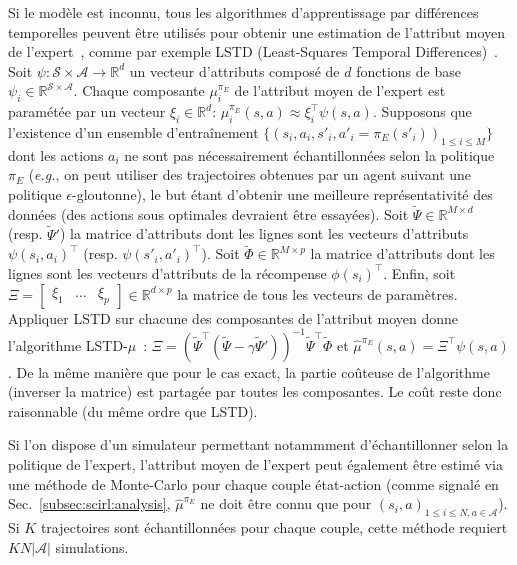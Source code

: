 \documentclass[english,utf8]{./hermes-journal}
\newcommand{\s}{\mathcal{S}}
\newcommand{\A}{\mathcal{A}}
\begin{document}
Si le modèle est inconnu, tous les algorithmes d'apprentissage par différences temporelles peuvent être utilisés pour obtenir une estimation de l'attribut moyen de l'expert~\cite{Klein:2011}, comme par exemple LSTD (Least-Squares Temporal
Differences)~\cite{Bradtke:1996}. Soit $\psi:\s\times \A \rightarrow
\mathbb{R}^d$ un vecteur d'attributs composé de $d$ fonctions de base
$\psi_i \in\mathbb{R}^{\s\times \A}$. Chaque composante $\mu_i^{\pi_E}$
 de l'attribut moyen de l'expert est paramétée par un vecteur
$\xi_i\in\mathbb{R}^d$: $\mu_i^{\pi_E}(s,a)\approx \xi_i^\top
\psi(s,a)$. Supposons que l'existence d'un ensemble d'entraînement
$\{(s_i,a_i,s'_i,a'_i=\pi_E(s'_i))_{1\leq i \leq M}\}$ dont les actions 
$a_i$ ne sont pas nécessairement échantillonnées selon la politique $\pi_E$
(\textit{e.g.}, on peut utiliser des trajectoires obtenues par un agent suivant une politique $\epsilon$-gloutonne), le but étant d'obtenir une meilleure représentativité des données (des actions sous optimales devraient être essayées). Soit $\tilde{\Psi}\in \mathbb{R}^{M\times d}$
(resp. $\tilde{\Psi}'$) la matrice d'attributs dont les lignes sont les vecteurs d'attributs $\psi(s_i,a_i)^\top$ (resp. $\psi(s'_i,a'_i)^\top$).
Soit $\tilde{\Phi}\in \mathbb{R}^{M\times p}$ la matrice d'attributs dont les lignes sont les vecteurs d'attributs de la récompense $\phi(s_i)^\top$.
Enfin, soit $\Xi =
\begin{bmatrix}   \xi_1 & \dots & \xi_p
\end{bmatrix}\in\mathbb{R}^{d\times p}$ la matrice de tous les vecteurs de paramètres. Appliquer LSTD sur chacune des composantes de l'attribut moyen donne l'algorithme LSTD-$\mu$~\cite{Klein:2011}: $\Xi =
(\tilde{\Psi}^\top(\tilde{\Psi} - \gamma
\tilde{\Psi}'))^{-1}\tilde{\Psi}^\top \tilde{\Phi}$ et
$\hat{\mu}^{\pi_E}(s,a) = \Xi^\top \psi(s,a)$.
De la même manière que pour le cas exact, la partie coûteuse de l'algorithme (inverser la matrice) est partagée par toutes les composantes. Le coût reste donc raisonnable (du même ordre que LSTD).

%
Si l'on dispose d'un simulateur permettant notammment d'échantillonner selon la politique de l'expert, l'attribut moyen de l'expert peut également être estimé via une méthode de Monte-Carlo pour chaque couple état-action (comme signalé en Sec.~\ref{subsec:scirl:analysis}, $\hat{\mu}^{\pi_E}$ ne doit être connu que pour $(s_i,a)_{1\leq i\leq N,a\in\A}$). Si $K$
trajectoires sont échantillonnées pour chaque couple, cette méthode requiert $KN|\A|$ simulations.
\end{document}
